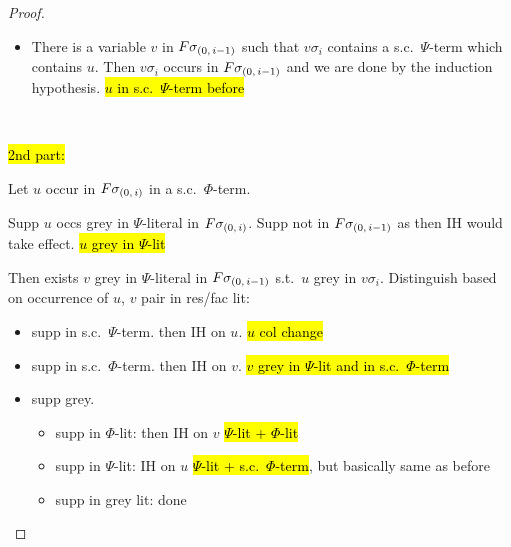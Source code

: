 \documentclass[,%
	draft=false,%
	numbers=noendperiod
	12pt,
	a4paper,
	oneside,%
	openany,
]{memoir}
\begin{document}
{\begin{proof}
\begin{itemize}
\begin{itemize}
					If it's in a $\Psi$-literal, then we are done by the IH on $u$. \hl{$\Psi$-lit + s.c.\ $\Phi$-term} (basically somewhat of propagation of preexisting circumstances)

					Otherwise the occurrence is grey in a grey literal, which we wanted to show. \hl{?}
			\end{itemize}


		\item There is a variable $v$ in $F\sigma_{(0,\,i-1)}$ such that $v\sigma_i$ contains a s.c.\ $\Psi$-term which contains $u$.
			Then $v\sigma_i$ occurs in $F\sigma_{(0,\,i-1)}$ and we are done by the induction hypothesis.
			\hl{$u$ in s.c.\ $\Psi$-term before}
	\end{itemize}


	~

	\hl{2nd part:} 

	Let $u$ occur in $F\sigma_{(0,\,i)}$ in a s.c.\ $\Phi$-term.

	Supp $u$ occs grey in $\Psi$-literal in $F\sigma_{(0,\,i)}$.
	Supp not in $F\sigma_{(0,\,i-1)}$ as then IH would take effect. \hl{$u$ grey in $\Psi$-lit}

	Then exists $v$ grey in $\Psi$-literal in $F\sigma_{(0,\,i-1)}$ s.t.\ $u$ grey in $v\sigma_i$.
	Distinguish based on occurrence of $u$, $v$ pair in res/fac lit:

	\begin{itemize}
		\item supp in s.c.\ $\Psi$-term. then IH on $u$. \hl{$u$ col change}
		\item supp in s.c.\ $\Phi$-term. then IH on $v$. \hl{$v$ grey in $\Psi$-lit and in s.c.\ $\Phi$-term}
		\item supp grey.
			\begin{itemize}
				\item supp in $\Phi$-lit: then IH on $v$ \hl{$\Psi$-lit + $\Phi$-lit}
				\item supp in $\Psi$-lit: IH on $u$ \hl{$\Psi$-lit + s.c.\ $\Phi$-term}, but basically same as before
				\item supp in grey lit: done

			\end{itemize}

	\end{itemize}





\end{proof}}
\end{document}
